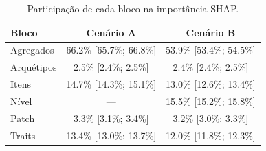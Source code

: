 \begin{table}[htbp]
\caption{Participação de cada bloco na importância SHAP.}
\label{tab:blocos}
\centering
\small
\begin{tabular}{lcc}
\toprule
Bloco & Cenário A & Cenário B \\
\midrule
Agregados & 66.2\% [65.7\%; 66.8\%] & 53.9\% [53.4\%; 54.5\%] \\
Arquétipos & 2.5\% [2.4\%; 2.5\%] & 2.4\% [2.4\%; 2.5\%] \\
Itens & 14.7\% [14.3\%; 15.1\%] & 13.0\% [12.6\%; 13.4\%] \\
Nível & — & 15.5\% [15.2\%; 15.8\%] \\
Patch & 3.3\% [3.1\%; 3.4\%] & 3.2\% [3.0\%; 3.3\%] \\
Traits & 13.4\% [13.0\%; 13.7\%] & 12.0\% [11.8\%; 12.3\%] \\
\bottomrule
\end{tabular}
\end{table}
